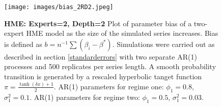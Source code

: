 \documentclass[12pt]{article}
\begin{document}
\begin{figure}[ht]
  \centering
  \texttt{[image: images/bias\_2RD2.jpeg]}
  \caption{\textbf{HME: Experts=2, Depth=2} Plot of parameter bias of a two-expert HME model as the size of the simulated series increases. Bias is defined as $b=n^{-1}\textstyle{\sum}(\beta_{i}-\beta^{*})$. Simulations were carried out as described in section \ref{standarderrors} with two separate AR(1) processes and 500 replicates per series length. A smooth probability transition is generated by a rescaled hyperbolic tanget function $\pi=\frac{\tanh(\delta x) + 1}{2}$. AR(1) parameters for regime one: $\phi_{1}=0.8$, $\sigma^{2}_{1}=0.1$. AR(1) parameters for regime two: $\phi_{1}=0.5$, $\sigma^{2}_{1}=0.03$.}
  \label{fig:bias_2RD2}
\end{figure}

\printbibliography
\end{document}

